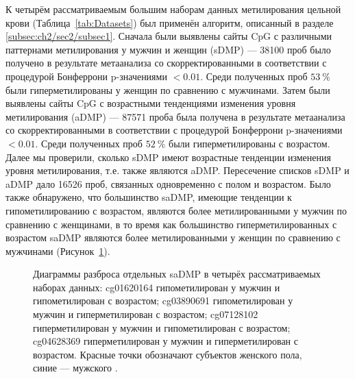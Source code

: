 К четырём рассматриваемым большим наборам данных метилирования цельной крови (Таблица~\ref{tab:Datasets}) был применён алгоритм, описанный в разделе \ref{subsec:ch2/sec2/subsec1}. Сначала были выявлены сайты CpG с различными паттернами метилирования у мужчин и женщин (sDMP) --- 38100 проб было получено в результате метаанализа со скорректированными в соответствии с процедурой Бонферрони p-значениями $< 0.01$. Среди полученных проб $53~\%$ были гиперметилированы у женщин по сравнению с мужчинами. Затем были выявлены сайты CpG с возрастными тенденциями изменения уровня метилирования (aDMP) --- 87571 проба была получена в результате метаанализа со скорректированными в соответствии с процедурой Бонферрони p-значениями $< 0.01$. Среди полученных проб $52~\%$ были гиперметилированы с возрастом. Далее мы проверили, сколько sDMP имеют возрастные тенденции изменения уровня метилирования, т.е. также являются aDMP. Пересечение списков sDMP и aDMP дало 16526 проб, связанных одновременно с полом и возрастом. Было также обнаружено, что большинство saDMP, имеющие тенденции к гипометилированию с возрастом, являются более метилированными у мужчин по сравнению с женщинами, в то время как большинство гиперметилированных с возрастом saDMP являются более метилированными у женщин по сравнению с мужчинами (Рисунок~\ref{fig:saDMP}).

\begin{figure}[ht]
	\caption{Диаграммы разброса отдельных saDMP в четырёх рассматриваемых наборах данных: cg01620164 гипометилирован у мужчин и гипометилирован с возрастом; cg03890691 гипометилирован у мужчин и гиперметилирован с возрастом; cg07128102 гиперметилирован у мужчин и гипометилирован с возрастом; cg04628369 гиперметилирован у мужчин и гиперметилирован с возрастом. Красные точки обозначают субъектов женского пола, синие --- мужского \autocite{Yusipov2020}.}\label{fig:saDMP}
\end{figure}

